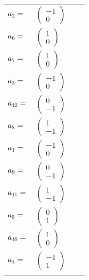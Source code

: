 \documentclass[1p]{elsarticle_modified}
\theoremstyle{definition}
\begin{document}
\begin{tabular}{m{7pt} m{180pt} m{7pt} m{180pt} }
\flushright $a_{2}=$&$\begin{pmatrix}-1\\0\end{pmatrix}$ \\
\flushright $a_{6}=$&$\begin{pmatrix}1\\0\end{pmatrix}$ \\
\flushright $a_{7}=$&$\begin{pmatrix}1\\0\end{pmatrix}$ \\
\flushright $a_{3}=$&$\begin{pmatrix}-1\\0\end{pmatrix}$ \\
\flushright $a_{12}=$&$\begin{pmatrix}0\\-1\end{pmatrix}$ \\
\flushright $a_{8}=$&$\begin{pmatrix}1\\-1\end{pmatrix}$ \\
\flushright $a_{1}=$&$\begin{pmatrix}-1\\0\end{pmatrix}$ \\
\flushright $a_{9}=$&$\begin{pmatrix}0\\-1\end{pmatrix}$ \\
\flushright $a_{11}=$&$\begin{pmatrix}1\\-1\end{pmatrix}$ \\
\flushright $a_{5}=$&$\begin{pmatrix}0\\1\end{pmatrix}$ \\
\flushright $a_{10}=$&$\begin{pmatrix}1\\0\end{pmatrix}$ \\
\flushright $a_{4}=$&$\begin{pmatrix}-1\\1\end{pmatrix}$\\&\end{tabular}
\end{document}
